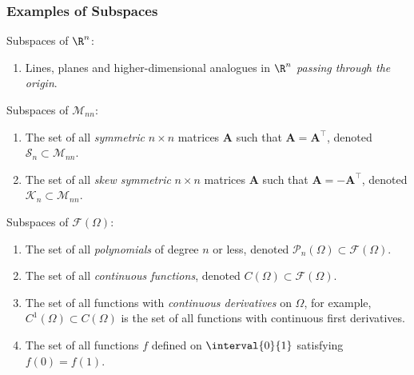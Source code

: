 \documentclass{article}
\begin{document}
\subsubsection{Examples of Subspaces}
Subspaces of \(\R^n\):
\begin{enumerate}
    \item Lines, planes and higher-dimensional analogues in \(\R^n\)
          \emph{passing through the origin}.
\end{enumerate}
Subspaces of \(\mathscr{M}_{nn}\):
\begin{enumerate}
    \item The set of all \emph{symmetric} \(n \times n\) matrices
          \(\symbf{A}\) such that \(\symbf{A} = \symbf{A}^\top\),
          denoted \(\mathscr{S}_n \subset \mathscr{M}_{nn}\).
    \item The set of all \emph{skew symmetric} \(n \times n\) matrices
          \(\symbf{A}\) such that \(\symbf{A} = -\symbf{A}^\top\),
          denoted \(\mathscr{K}_n \subset \mathscr{M}_{nn}\).
\end{enumerate}
Subspaces of \(\mathscr{F}\left( \Omega \right)\):
\begin{enumerate}
    \item The set of all \emph{polynomials} of degree \(n\) or less,
          denoted \(\mathscr{P}_n\left( \Omega \right) \subset
          \mathscr{F}\left( \Omega \right)\).
    \item The set of all \emph{continuous functions}, denoted \(C\left(
          \Omega \right) \subset \mathscr{F}\left( \Omega \right)\).
    \item The set of all functions with \emph{continuous derivatives}
          on \(\Omega\), for example, \(C^1\left( \Omega \right)
          \subset C\left( \Omega \right)\) is the set of all functions
          with continuous first derivatives.
    \item The set of all functions \(f\) defined on \(\interval{0}{1}\)
          satisfying \(f\left( 0 \right) = f\left( 1 \right)\).
\end{enumerate}
\end{document}
